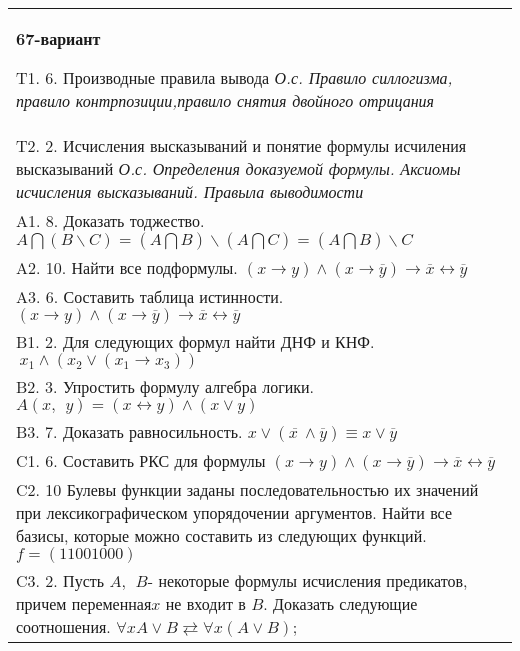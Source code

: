 \documentclass{article}
\begin{document}
\begin{tabular}{m{17cm}}
\textbf{67-вариант}
\newline

T1. 6. Производные правила вывода \emph{О.с. Правило силлогизма, правило контрпозиции,правило снятия двойного отрицания} \\
T2. 2. Исчисления высказываний и понятие формулы исчиления высказываний \emph{О.с. Определения доказуемой формулы. Аксиомы исчисления высказываний. Правыла выводимости} \\
A1. 8. Доказать тоджество. \(A\bigcap(B\backslash C) = (A\bigcap B)\backslash(A\bigcap C) = (A\bigcap B)\backslash C\) \\
A2. 10. Найти все подформулы. \((x \rightarrow y) \land (x \rightarrow \overline{y}) \rightarrow \overline{x} \leftrightarrow \overline{y}\) \\
A3. 6. Составить таблица истинности. \((x \rightarrow y) \land (x \rightarrow \overline{y}) \rightarrow \overline{x} \leftrightarrow \overline{y}\) \\
B1. 2. Для следующих формул найти ДНФ и КНФ. \(\ x_{1} \land (x_{2} \vee (x_{1} \rightarrow x_{3}))\) \\
B2. 3. Упростить формулу алгебра логики. \(A(x,\ \ y) = (x \leftrightarrow y) \land (x \vee y)\) \\
B3. 7. Доказать равносильность. \(x \vee \left( \overline{x\ } \land \overline{y} \right) \equiv x \vee \overline{y}\) \\
C1. 6. Составить РКС для формулы \((x \rightarrow y) \land (x \rightarrow \overline{y}) \rightarrow \overline{x} \leftrightarrow \overline{y}\) \\
C2. 10 Булевы функции заданы последовательностью их значений при лексикографическом упорядочении аргументов. Найти все базисы, которые можно составить из следующих функций. \(f = (11001000)\) \\
C3. 2. Пусть \(A,\ \ B\)- некоторые формулы исчисления предикатов, причем переменная\(x\) не входит в \(B\). Доказать следующие соотношения. \(\forall xA \vee B \rightleftarrows \forall x(A \vee B)\); \\

\end{tabular}
\vspace{1cm}
\end{document}
